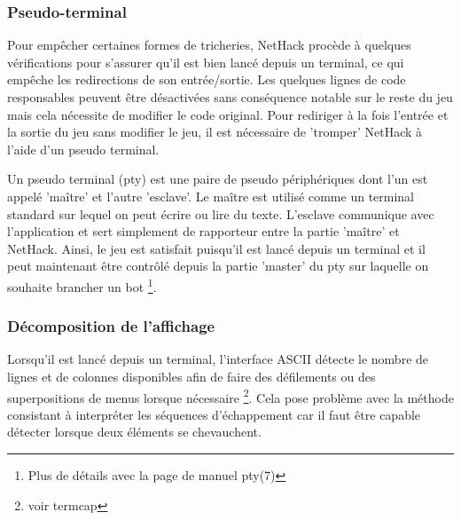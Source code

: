 \documentclass[a4paper,12pt]{article}
\begin{document}
\subsubsection*{Pseudo-terminal}

Pour empêcher certaines formes de tricheries, NetHack procède à quelques vérifications pour s'assurer qu'il est bien lancé depuis un terminal, ce qui empêche les redirections de son entrée/sortie. Les quelques lignes de code responsables peuvent être désactivées sans conséquence notable sur le reste du jeu mais cela nécessite de modifier le code original. Pour rediriger à la fois l'entrée et la sortie du jeu sans modifier le jeu, il est nécessaire de 'tromper' NetHack à l'aide d'un pseudo terminal.

Un pseudo terminal (pty) est une paire de pseudo périphériques dont l'un est appelé 'maître' et l'autre 'esclave'. Le maître est utilisé comme un terminal standard sur lequel on peut écrire ou lire du texte. L'esclave communique avec l'application et sert simplement de rapporteur entre la partie 'maître' et NetHack. Ainsi, le jeu est satisfait puisqu'il est lancé depuis un terminal et il peut maintenant être contrôlé depuis la partie 'master' du pty sur laquelle on souhaite brancher un bot \footnote{Plus de détails avec la page de manuel pty(7)}.


\subsubsection*{Décomposition de l'affichage}

Lorsqu'il est lancé depuis un terminal, l'interface ASCII détecte le nombre de lignes et de colonnes disponibles afin de faire des défilements ou des superpositions de menus lorsque nécessaire \footnote{voir termcap}. Cela pose problème avec la méthode consistant à interpréter les séquences d'échappement car il faut être capable détecter lorsque deux éléments se chevauchent.
\end{document}
